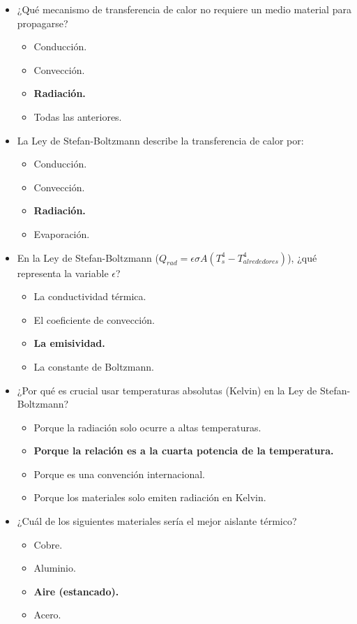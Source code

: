 \documentclass{article}
\begin{document}
\begin{enumerate}[label=\arabic*.]
\begin{itemize}[label=\alph*)]
    \item ¿Qué mecanismo de transferencia de calor no requiere un medio material para propagarse?
    \begin{itemize}[label=\alph*)]
        \item Conducción.
        \item Convección.
        \item \textbf{Radiación.}
        \item Todas las anteriores.
    \end{itemize}

    \item La Ley de Stefan-Boltzmann describe la transferencia de calor por:
    \begin{itemize}[label=\alph*)]
        \item Conducción.
        \item Convección.
        \item \textbf{Radiación.}
        \item Evaporación.
    \end{itemize}

    \item En la Ley de Stefan-Boltzmann ($Q_{rad} = \epsilon \sigma A (T_s^4 - T_{alrededores}^4)$), ¿qué representa la variable $\epsilon$?
    \begin{itemize}[label=\alph*)]
        \item La conductividad térmica.
        \item El coeficiente de convección.
        \item \textbf{La emisividad.}
        \item La constante de Boltzmann.
    \end{itemize}

    \item ¿Por qué es crucial usar temperaturas absolutas (Kelvin) en la Ley de Stefan-Boltzmann?
    \begin{itemize}[label=\alph*)]
        \item Porque la radiación solo ocurre a altas temperaturas.
        \item \textbf{Porque la relación es a la cuarta potencia de la temperatura.}
        \item Porque es una convención internacional.
        \item Porque los materiales solo emiten radiación en Kelvin.
    \end{itemize}

    \item ¿Cuál de los siguientes materiales sería el mejor aislante térmico?
    \begin{itemize}[label=\alph*)]
        \item Cobre.
        \item Aluminio.
        \item \textbf{Aire (estancado).}
        \item Acero.
    \end{itemize}


\end{itemize}
\end{enumerate}
\end{document}
